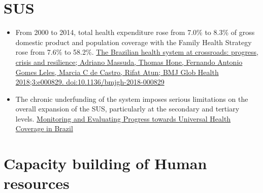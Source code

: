 \documentclass[]{book}
\begin{document}
\hypertarget{sus}{%
\section*{SUS}\label{sus}}

\begin{itemize}
\item
  From 2000 to 2014, total health expenditure rose from 7.0\% to 8.3\% of gross domestic product and population coverage with the Family Health Strategy rose from 7.6\% to 58.2\%. \href{https://journals.plos.org/plosmedicine/article/file?id=10.1371/journal.pmed.1001692\&type=printable}{The Brazilian health system at crossroads: progress, crisis and resilience; Adriano Massuda, Thomas Hone, Fernando Antonio Gomes Leles, Marcia C de Castro, Rifat Atun; BMJ Glob Health 2018;3:e000829. doi:10.1136/bmjgh-2018-000829}
\item
  The chronic underfunding of the system imposes serious limitations on the overall expansion of the SUS, particularly at the secondary and tertiary levels. \href{https://journals.plos.org/plosmedicine/article?id=10.1371/journal.pmed.1001692\#}{Monitoring and Evaluating Progress towards Universal Health Coverage in Brazil}
\end{itemize}

\hypertarget{capacity-building-of-human-resources}{%
\section*{Capacity building of Human resources}\label{capacity-building-of-human-resources}}
\end{document}
